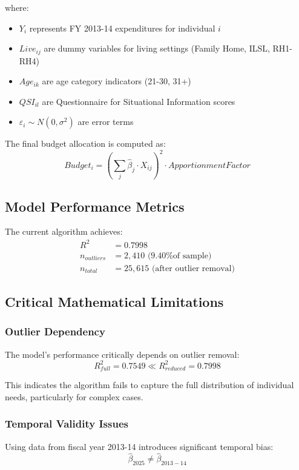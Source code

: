 \documentclass[12pt]{article}
\begin{document}
where:
\begin{itemize}
    \item $Y_i$ represents FY 2013-14 expenditures for individual $i$
    \item $Live_{ij}$ are dummy variables for living settings (Family Home, ILSL, RH1-RH4)
    \item $Age_{ik}$ are age category indicators (21-30, 31+)
    \item $QSI_{il}$ are Questionnaire for Situational Information scores
    \item $\varepsilon_i \sim N(0, \sigma^2)$ are error terms
\end{itemize}

The final budget allocation is computed as:
\begin{equation}
Budget_i = \left(\sum_{j} \hat{\beta}_j \cdot X_{ij}\right)^2 \cdot ApportionmentFactor
\end{equation}

\subsection{Model Performance Metrics}

The current algorithm achieves:
\begin{align}
R^2 &= 0.7998 \\
n_{outliers} &= 2,410 \text{ (9.40\% of sample)} \\
n_{total} &= 25,615 \text{ (after outlier removal)}
\end{align}

\subsection{Critical Mathematical Limitations}

\subsubsection{Outlier Dependency}
The model's performance critically depends on outlier removal:
\begin{equation}
R^2_{full} = 0.7549 \ll R^2_{reduced} = 0.7998
\end{equation}

This indicates the algorithm fails to capture the full distribution of individual needs, particularly for complex cases.

\subsubsection{Temporal Validity Issues}
Using data from fiscal year 2013-14 introduces significant temporal bias:
\begin{equation}
\hat{\beta}_{2025} \neq \hat{\beta}_{2013-14}
\end{equation}
\end{document}
